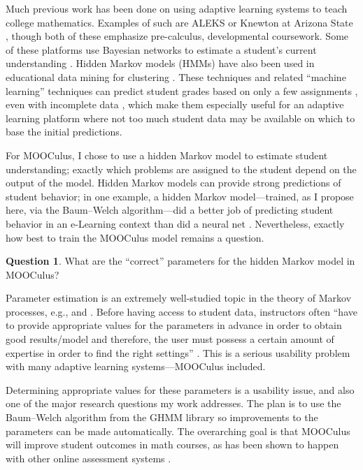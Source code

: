 \documentclass[12pt]{amsart}
\theoremstyle{definition}
\newtheorem{question}[theorem]{Question}
\begin{document}
Much previous work has been done on using adaptive learning systems to
teach college mathematics.  Examples of such are ALEKS
\cite{hagerty2005using,albert1999knowledge} or Knewton at Arizona
State \cite{parry2012big}, though both of these emphasize
pre-calculus, developmental coursework.  Some of these platforms use
Bayesian networks to estimate a student's current understanding
\cite{romero2010educational}.  Hidden Markov models (HMMs) have also
been used in educational data mining for clustering
\cite{shihdiscovery}.  These techniques and related ``machine
learning'' techniques can predict student grades based on only a few
assignments \cite{predict-grades}, even with incomplete data
\cite{Zafra201115020}, which make them especially useful for an
adaptive learning platform where not too much student data may be
available on which to base the initial predictions.

For MOOCulus, I chose to use a hidden Markov model to estimate student
understanding; exactly which problems are assigned to the student
depend on the output of the model.  Hidden Markov models can provide
strong predictions of student behavior; in one example, a hidden
Markov model---trained, as I propose here, via the Baum--Welch
algorithm---did a better job of predicting student behavior in an
e-Learning context than did a neural net \cite{anari2012intelligent}.
Nevertheless, exactly how best to train the MOOCulus model remains a
question.
\begin{question}
  What are the ``correct'' parameters for the hidden Markov model in
  MOOCulus?
\end{question}
Parameter estimation is an extremely well-studied topic in the theory
of Markov processes, e.g., \cite{MR202264} and \cite{MR123419}.
Before having access to student data, instructors often ``have to
provide appropriate values for the parameters in advance in order to
obtain good results/model and therefore, the user must possess a
certain amount of expertise in order to find the right
settings'' \cite{romero2010educational}.  This is a serious
usability problem with many adaptive learning systems---MOOCulus
included.

Determining appropriate values for these parameters is a usability
issue, and also one of the major research questions my work addresses.
The plan is to use the Baum--Welch algorithm from the GHMM library
\cite{ghmm} so improvements to the parameters can be made
automatically.  The overarching goal is that MOOCulus will improve
student outcomes in math courses, as has been shown to happen with
other online assessment systems \cite{angus2009does}.

\printbibliography
\end{document}
